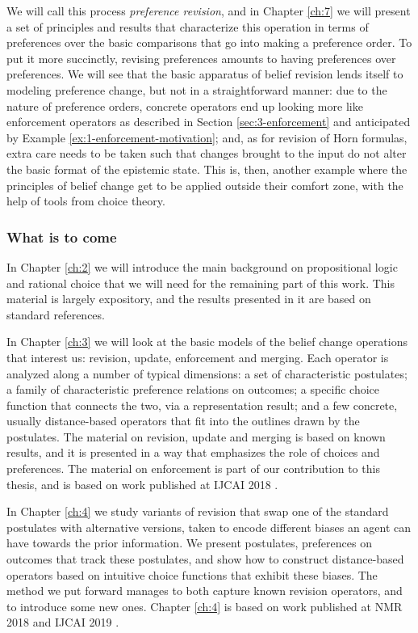 We will call this process \emph{preference revision},
and in Chapter \ref{ch:7} we will present a set 
of principles and results that characterize 
this operation in terms of preferences over 
the basic comparisons that go into making a 
preference order. To put it more succinctly,
revising preferences amounts to having preferences 
over preferences. We will see that the basic apparatus of 
belief revision lends itself to modeling 
preference change, but not in a straightforward 
manner: due to the nature of preference orders,
concrete operators end up looking more 
like enforcement operators as described 
in Section \ref{sec:3-enforcement} and anticipated
by Example \ref{ex:1-enforcement-motivation};
and, as for revision of Horn formulas, 
extra care needs to be taken such that 
changes brought to the input do not alter the 
basic format of the epistemic state.
This is, then, another example where 
the principles of belief change get to be 
applied outside their comfort zone,
with the help of tools from choice theory.

\subsubsection{What is to come}
In Chapter \ref{ch:2} we will introduce the 
main background on propositional logic 
and rational choice that we will need for the 
remaining part of this work.
This material is largely expository, and 
the results presented in it are based on 
standard references.

In Chapter \ref{ch:3} we will look at the 
basic models of the belief change operations
that interest us: revision, update, enforcement 
and merging. Each operator is analyzed along a 
number of typical dimensions:  
a set of characteristic postulates;
a family of characteristic preference relations on outcomes; 
a specific choice function that 
connects the two, via a representation result;
and a few concrete, usually distance-based operators that 
fit into the outlines drawn by the postulates.
The material on revision, update and merging is 
based on known results, and it is
presented in a way that emphasizes the role of 
choices and preferences. 
The material on enforcement is part of our contribution 
to this thesis, 
and is based on work published at IJCAI 2018 \cite{HaretWW18}.

In Chapter \ref{ch:4} we study variants of revision
that swap one of the standard postulates with alternative 
versions, taken to encode different biases an agent 
can have towards the prior information. 
We present postulates, preferences on outcomes 
that track these postulates, and show how to construct 
distance-based operators based on intuitive choice 
functions that exhibit these biases.
The method we put forward manages to both capture 
known revision operators, and to introduce some new ones. 
Chapter \ref{ch:4} is based on work published at 
NMR 2018 \cite{HaretW2018b} and IJCAI 2019 \cite{HaretW19a}.

